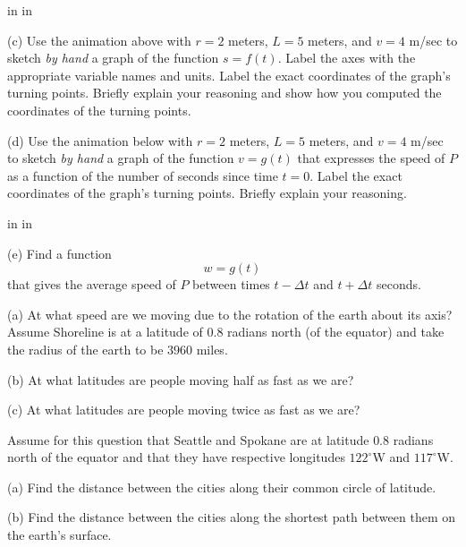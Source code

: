 \documentclass{ximera}
\newcommand{\pskip}{\vskip 0.1 in}
\begin{document}
\begin{question}
 
\begin{onlineOnly}
    \begin{center}
\end{center}
\end{onlineOnly}


\pskip \pskip

(c) Use the animation above with $r=2$ meters, $L=5$ meters, and $v=4$ m/sec to sketch \emph{by hand} a graph of the function $s=f(t)$. Label the axes with the appropriate variable names and units. Label the exact coordinates of the graph's turning points. Briefly explain your reasoning and show how you computed the coordinates of the turning points. 

(d) Use the animation below with $r=2$ meters, $L=5$ meters, and $v=4$ m/sec to sketch \emph{by hand} a graph of the function $v=g(t)$ that expresses the speed of $P$ as a function of the number of seconds since time $t=0$. Label the exact coordinates of the graph's turning points. Briefly explain your reasoning. 

\pskip \pskip

(e) Find a function
\[
    w = g(t)
\]
that gives the average speed of $P$ between times $t-\Delta t$ and $t+\Delta t$ seconds.

 

\end{question}


\begin{question}  \label{Qdegb574}
(a) At what speed are we moving due to the rotation of the earth about its axis? Assume Shoreline is at a latitude of $0.8$ radians
north (of the equator) and take the radius of the earth to be $3960$ miles.

(b) At what latitudes are people moving half as fast as we are?

(c) At what latitudes are people moving twice as fast as we are?

\end{question}

\begin{question} \label{Q34ft45rtg}
Assume for this question that Seattle and Spokane are at latitude $0.8$ radians north of the equator and that they have respective longitudes $122^\circ$W and $117^\circ$W.

(a) Find the distance between the cities along their common circle of latitude.

(b) Find the distance between the cities along the shortest path between them on the earth's surface.

\end{question}
\end{document}
